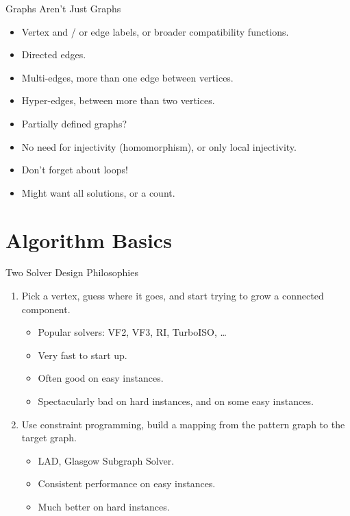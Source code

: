 \documentclass[aspectratio=169,compress,10pt]{beamer}
\begin{document}
\begin{frame}{Graphs Aren't Just Graphs}
    \begin{itemize}
        \item Vertex and / or edge labels, or broader compatibility functions.
        \item Directed edges.
        \item Multi-edges, more than one edge between vertices.
        \item Hyper-edges, between more than two vertices.
        \item Partially defined graphs?
        \item No need for injectivity (homomorphism), or only local injectivity.
        \item <2-> Don't forget about loops!
        \item <3-> Might want all solutions, or a count.
    \end{itemize}
\end{frame}

\section{Algorithm Basics}

\begin{frame}{Two Solver Design Philosophies}
    \begin{enumerate}
        \item Pick a vertex, guess where it goes, and start trying to grow a connected component.
            \begin{itemize}
                \item Popular solvers: VF2, VF3, RI, TurboISO, \ldots
                \item Very fast to start up.
                \item Often good on easy instances.
                \item Spectacularly bad on hard instances, and on some easy instances.
            \end{itemize}
        \item Use constraint programming, build a mapping from the pattern graph to the target
            graph.
            \begin{itemize}
                \item LAD, Glasgow Subgraph Solver.
                \item Consistent performance on easy instances.
                \item Much better on hard instances.
            \end{itemize}
    \end{enumerate}
\end{frame}
\end{document}

